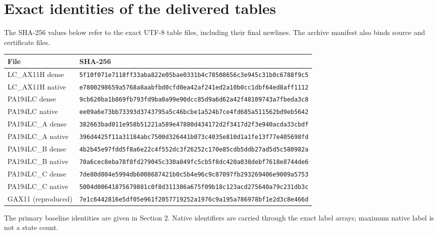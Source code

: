 \section{Exact identities of the delivered tables}
The SHA-256 values below refer to the exact UTF-8 table files, including their final newlines. The archive manifest also binds source and certificate files.
\begingroup\small
\begin{longtable}{@{}p{}p{}@{}}
\toprule
File & SHA-256\\
\midrule\endhead
LC\_AX11H dense & \nolinkurl{5f10f071e7118ff33aba822e05bae0331b4c78508656c3e945c31b0c6788f9c5}\\[4pt]
LC\_AX11H native & \nolinkurl{e7800298659a5768a8aabfbd0cfd0ea42af241ed2a10b0cc1dbf64ed8aff1112}\\[4pt]

PA194LC dense & \nolinkurl{9cb620ba1b869fb793fd9ba0a99e90dcc85d9a6d62a42f48109743a7fbeda3c8}\\[4pt]
PA194LC native & \nolinkurl{ee09a6e73bb73393d3743795a5c46bcbe1a524b7ce4fd685a511562bd9eb5642}\\[4pt]
PA194LC\_A dense & \nolinkurl{382663bad011e958b51221a589e47880d434172d2f3417d2f3e940acda33cbdf}\\[4pt]
PA194LC\_A native & \nolinkurl{396d4425f11a31184abc7500d326441b073c4035e810d1a1fe13f77e405698fd}\\[4pt]
PA194LC\_B dense & \nolinkurl{4b2b45e97fdd5f8a6e22c4f552dc3f26252c170e85cdb5ddb27ad5d5c580982a}\\[4pt]
PA194LC\_B native & \nolinkurl{70a6cec8eba78f8fd279045c330a849fc5cb5f8dc420a038debf7618e8744de6}\\[4pt]
PA194LC\_C dense & \nolinkurl{7de80d804e5994db6008687421b0c5b4e96c9c87097fb293269406e9009a5753}\\[4pt]
PA194LC\_C native & \nolinkurl{5004d00641875679881c0f8d311386a675f09b18c123acd275640a79c231db3c}\\[4pt]
GAX11 (reproduced) & \nolinkurl{7e1c6442816e5df05e961f2057719252a1976c9a195a786978bf1e2d3c8e466d}\\[4pt]
\bottomrule\end{longtable}\endgroup
The primary baseline identities are given in Section 2. Native identifiers are carried through the exact label arrays; maximum native label is not a state count.
